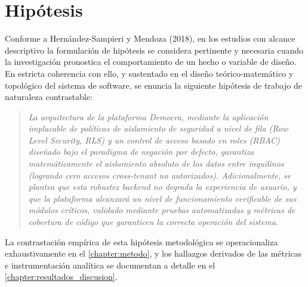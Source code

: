 \section{Hipótesis}
\label{section:hipotesis}
Conforme a Hernández-Sampieri y Mendoza (2018), en los estudios con alcance descriptivo la formulación de hipótesis se considera pertinente y necesaria cuando la investigación pronostica el comportamiento de un hecho o variable de diseño. En estricta coherencia con ello, y sustentado en el diseño teórico-matemático y topológico del sistema de software, se enuncia la siguiente hipótesis de trabajo de naturaleza contrastable:

\begin{quote}
\itshape La arquitectura de la plataforma Democra, mediante la aplicación implacable de políticas de aislamiento de seguridad a nivel de fila (\textit{Row Level Security}, RLS) y un control de acceso basado en roles (RBAC) diseñado bajo el paradigma de negación por defecto, garantiza matemáticamente el aislamiento absoluto de los datos entre inquilinos (logrando cero accesos \textit{cross-tenant} no autorizados). Adicionalmente, se plantea que esta robustez \textit{backend} no degrada la experiencia de usuario, y que la plataforma alcanzará un nivel de funcionamiento verificable de sus módulos críticos, validado mediante pruebas automatizadas y métricas de cobertura de código que garanticen la correcta operación del sistema.
\end{quote}

La contrastación empírica de esta hipótesis metodológica se operacionaliza exhaustivamente en el \autoref{chapter:metodo}, y los hallazgos derivados de las métricas e instrumentación analítica se documentan a detalle en el \autoref{chapter:resultados_discusion}.
